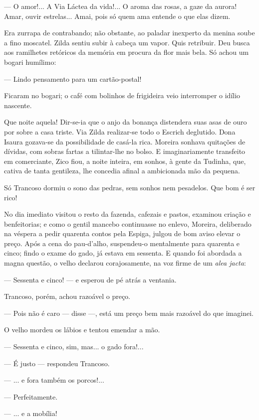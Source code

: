 --- O amor!... A Via Láctea da vida!... O aroma das rosas, a gaze da
aurora! Amar, ouvir estrelas... Amai, pois só quem ama entende o que
elas dizem.

Era zurrapa de contrabando; não obstante, ao paladar inexperto da menina
soube a fino moscatel. Zilda sentiu subir à cabeça um vapor. Quis
retribuir. Deu busca aos ramilhetes retóricos da memória em procura da
flor mais bela. Só achou um bogari humílimo:

--- Lindo pensamento para um cartão-postal!

Ficaram no bogari; o café com bolinhos de frigideira veio interromper o
idílio nascente.

Que noite aquela! Dir-se-ia que o anjo da bonança distendera suas asas
de ouro por sobre a casa triste. Via Zilda realizar-se todo o Escrich
deglutido. Dona Isaura gozava-se da possibilidade de casá-la rica.
Moreira sonhava quitações de dívidas, com sobras fartas a tilintar-lhe
no bolso. E imaginariamente transfeito em comerciante, Zico fiou, a
noite inteira, em sonhos, à gente da Tudinha, que, cativa de tanta
gentileza, lhe concedia afinal a ambicionada mão da pequena.

Só Trancoso dormiu o sono das pedras, sem sonhos nem pesadelos. Que bom
é ser rico!

No dia imediato visitou o resto da fazenda, cafezais e pastos, examinou
criação e benfeitorias; e como o gentil mancebo continuasse no enlevo,
Moreira, deliberado na véspera a pedir quarenta contos pela Espiga,
julgou de bom aviso elevar o preço. Após a cena do pau-d'alho,
suspendeu-o mentalmente para quarenta e cinco; findo o exame do gado, já
estava em sessenta. E quando foi abordada a magna questão, o velho
declarou corajosamente, na voz firme de um \emph{alea jacta}:

--- Sessenta e cinco! --- e esperou de pé atrás a ventania.

Trancoso, porém, achou razoável o preço.

--- Pois não é caro --- disse ---, está um preço bem mais razoável do
que imaginei.

O velho mordeu os lábios e tentou emendar a mão.

--- Sessenta e cinco, sim, mas... o gado fora!...

--- É justo --- respondeu Trancoso.

--- ... e fora também os porcos!...

--- Perfeitamente.

--- ... e a mobília!

